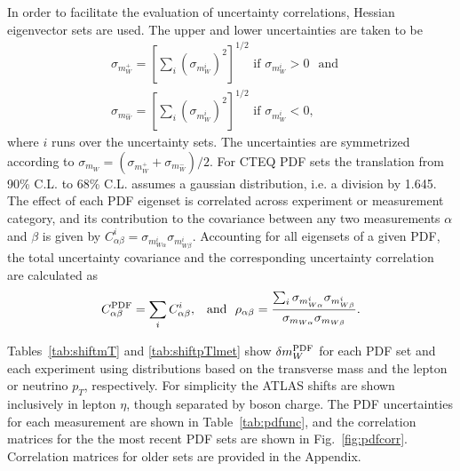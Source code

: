 In order to facilitate the evaluation of uncertainty correlations, Hessian eigenvector sets are 
used.  The upper and lower uncertainties are taken to be 
\begin{eqnarray}
\sigma_{m_{W}^+} = \left[\sum_i \left({\sigma_{m_{W}^i}}\right)^2\right]^{1/2} \textrm{ if } \sigma_{m_{W}^i}>0 
~\,\,\,\textrm{and} \,\,\,\,\,\, \nonumber \\
\sigma_{m_{W}^-} = \left[\sum_i \left({\sigma_{m_{W}^i}}\right)^2\right]^{1/2} \textrm{ if } \sigma_{m_{W}^i}<0,
\end{eqnarray}
where $i$ runs over the uncertainty sets.  The uncertainties are symmetrized according to 
$\sigma_{m_{W}} = (\sigma_{m_{W}^+} + \sigma_{m_{W}^-})/2$.  For CTEQ PDF sets the translation from 90\% C.L. 
to 68\% C.L. assumes a gaussian distribution, i.e. a division by 1.645.  The effect of each PDF eigenset 
is correlated across experiment or measurement category, and its contribution to the covariance between 
any two measurements $\alpha$ and $\beta$ is given by
$C^i_{\alpha\beta} = \sigma_{m_{W\alpha}^i} \sigma_{m_{W\beta}^i}$.
Accounting for all eigensets of a given PDF, the total uncertainty covariance and the corresponding 
uncertainty correlation are calculated as
\begin{equation}
C^{\scriptsize\textrm{PDF}}_{\alpha\beta} = \sum_i C^i_{\alpha\beta},~\,\,\,\textrm{and}\,\,\,\,\rho_{\alpha\beta} = 
\frac{\sum_i \sigma_{m_{W\alpha}^i} \sigma_{m_{W\beta}^i}}{\sigma_{m_{W\alpha}}\sigma_{m_{W\beta}}}.
\end{equation}

Tables~\ref{tab:shiftmT} and \ref{tab:shiftpTlmet} show $\delta m_W^{\scriptsize\textrm{PDF}}$ for each PDF set and each 
experiment using distributions based on the transverse mass and the lepton or neutrino $p_T$, respectively.  
For simplicity the ATLAS shifts are shown inclusively in lepton $\eta$, though separated by boson charge.
The PDF uncertainties for each measurement are shown in Table~\ref{tab:pdfunc}, and the correlation 
matrices for the the most recent PDF sets are shown in Fig.~\ref{fig:pdfcorr}.  Correlation matrices for
older sets are provided in the Appendix.

